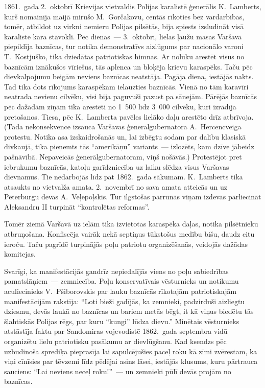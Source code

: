 \documentclass[twoside,a5paper,12pt,fleqn,openany]{extbook}
\begin{document}
1861.~gada 2.~oktobrī Krievijas vietvaldis Polijas karalistē ģenerālis K.~Lamberts, kurš nomainīja maijā mirušo M.~Gorčakovu, centās rīkoties bez vardarbības, tomēr, atbildot uz virkni nemieru Polijas pilsētās, bija spiests izsludināt visā karalistē kara stāvokli. Pēc dienas~--- 3.~oktobrī, lielas ļaužu masas Varšavā piepildīja baznīcas, tur notika demonstratīvs aizlūgums par nacionālo varoni T.~Kostjuško, tika dziedātas patriotiskas himnas. Ar nolūku arestēt visus no baznīcām iznākušos vīriešus, tās aplenca un bloķēja krievu karaspēks. Taču pēc dievkalpojumu beigām neviens baznīcas neatstāja. Pagāja diena, iestājās nakts. Tad tika dots rīkojums karaspēkam ielauzties baznīcās. Vienā no tām karavīri neatrada nevienu cilvēku, visi bija paguvuši pazust pa sānejām. Pārējās baznīcās pēc dažādām ziņām tika arestēti no 1~500 līdz 3~000 cilvēku, kuri izrādīja pretošanos. Tiesa, pēc K.~Lamberta pavēles lielāko daļu arestēto drīz atbrīvoja. (Tāda nekonsekvence izsauca Varšavas ģenerālgubernatora A.~Hercencveiga protestu. Notika asa izskaidrošanās un, lai izbēgtu sodam par dalību klasiskā divkaujā, tika pieņemts tās ``amerikāņu'' variants~--- izlozēts, kam dzīve jābeidz pašnāvībā. Nepaveicās ģenerālgubernatoram, viņš nošāvās.) Protestējot pret iebrukumu baznīcās, katoļu garīdzniecība uz laiku slēdza visus Varšavas dievnamus. Tie nedarbojās līdz pat 1862.~gada sākumam. K.~Lamberts tika atsaukts no vietvalža amata. 2.~novembrī no sava amata atteicās un uz Pēterburgu devās A.~Veļepoļskis. Tur ilgstošās pārrunās viņam izdevās pārliecināt Aleksandru II turpināt ``kontrolētas reformas''.

Tomēr ziemā Varšavā uz ielām tika izvietotas karaspēka daļas, notika pilsētnieku atbruņošana. Konfiscēja vairāk nekā septiņus tūkstošus medību bišu, daudz citu ieroču. Taču pagrīdē turpinājās poļu patriotu organizēšanās, veidojās dažādas komitejas.

Svarīgi, ka manifestācijās gandrīz nepiedalījās viens no poļu sabiedrības pamatslāņiem~--- zemniecība. Poļu konservatīvais vēsturnieks un notikumu aculiecinieks V.~Pšiborovskis par lauku baznīcās rīkotajām patriotiskajām manifestācijām rakstīja: ``Ļoti bieži gadījās, ka zemnieki, padzirduši aizliegtu dziesmu, devās laukā no baznīcas un bariem metās bēgt, it kā viņus biedētu tās šļahtiskās Polijas rēgs, par kuru ``kungi'' lūdza dievu.'' Minētais vēsturnieks atstāstīja faktu par Sandomiras vojevodistē 1862.~gada septembra vidū organizētu lielu patriotisku pasākumu ar dievlūgšanu. Kad ksendzs pēc uzbudinoša sprediķa pieprasīja lai sapulcējušies paceļ roku kā zīmi zvērestam, ka viņi cīnīsies par tēvzemi līdz pēdējai asins lāsei, iestājās klusums, kuru pārtrauca sauciens: ``Lai neviens neceļ roku!''~--- un zemnieki pūlī devās projām no baznīcas.
\end{document}
